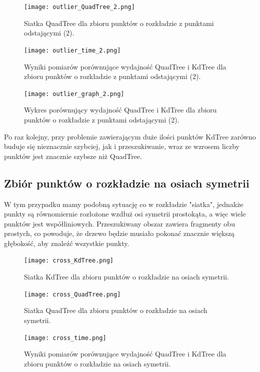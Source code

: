 \documentclass{lab}
\begin{document}
\begin{figure}[H]
  \centering
  \texttt{[image: outlier\_QuadTree\_2.png]}
  \caption{Siatka QuadTree dla zbioru punktów o rozkładzie z punktami odstającymi (2).}
  \label{fig:outlier_QuadTree_2}
\end{figure}

\begin{figure}[H]
  \centering
  \texttt{[image: outlier\_time\_2.png]}
  \caption{Wyniki pomiarów porównujące wydajność QuadTree i KdTree dla zbioru punktów o rozkładzie z punktami odstającymi (2).}
  \label{fig:outlier_time_2}
\end{figure}

\begin{figure}[H]
  \centering
  \texttt{[image: outlier\_graph\_2.png]}
  \caption{Wykres porównujący wydajność QuadTree i KdTree dla zbioru punktów o rozkładzie z punktami odstającymi (2).}
  \label{fig:outlier_graph_2}
\end{figure}

Po raz kolejny, przy problemie zawierającym duże ilości punktów KdTree zarówno buduje się nieznacznie szybciej, jak i przeszukiwanie, wraz ze wzrosem liczby punktów jest znacznie szybsze niż QuadTree.

\subsection{Zbiór punktów o rozkładzie na osiach symetrii}
W tym przypadku mamy podobną sytuację co w rozkładzie "siatka", jednakże punkty są równomiernie rozłożone wzdłuż osi symetrii prostokąta, a więc wiele punktów jest współliniowych.
Przeszukiwany obszar zawiera fragmenty obu prostych, co powoduje, że drzewo będzie musiało pokonać znacznie większą głębokość, aby znaleźć wszystkie punkty.

\begin{figure}[H]
  \centering
  \texttt{[image: cross\_KdTree.png]}
  \caption{Siatka KdTree dla zbioru punktów o rozkładzie na osiach symetrii.}
  \label{fig:cross_KdTree}
\end{figure}

\begin{figure}[H]
  \centering
  \texttt{[image: cross\_QuadTree.png]}
  \caption{Siatka QuadTree dla zbioru punktów o rozkładzie na osiach symetrii.}
  \label{fig:cross_QuadTree}
\end{figure}

\begin{figure}[H]
  \centering
  \texttt{[image: cross\_time.png]}
  \caption{Wyniki pomiarów porównujące wydajność QuadTree i KdTree dla zbioru punktów o rozkładzie na osiach symetrii.}
  \label{fig:cross_time}
\end{figure}
\end{document}
